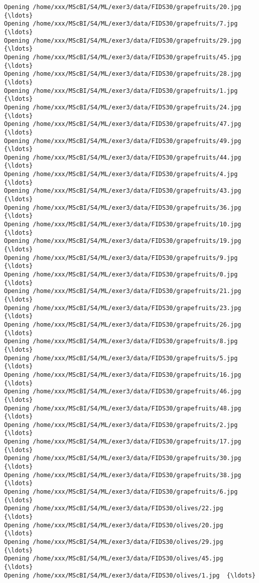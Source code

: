 \documentclass[11pt]{article}
\begin{document}
\begin{Verbatim}[commandchars=\\\{\}]
Opening /home/xxx/MScBI/S4/ML/exer3/data/FIDS30/grapefruits/20.jpg  {\ldots}
Opening /home/xxx/MScBI/S4/ML/exer3/data/FIDS30/grapefruits/7.jpg  {\ldots}
Opening /home/xxx/MScBI/S4/ML/exer3/data/FIDS30/grapefruits/29.jpg  {\ldots}
Opening /home/xxx/MScBI/S4/ML/exer3/data/FIDS30/grapefruits/45.jpg  {\ldots}
Opening /home/xxx/MScBI/S4/ML/exer3/data/FIDS30/grapefruits/28.jpg  {\ldots}
Opening /home/xxx/MScBI/S4/ML/exer3/data/FIDS30/grapefruits/1.jpg  {\ldots}
Opening /home/xxx/MScBI/S4/ML/exer3/data/FIDS30/grapefruits/24.jpg  {\ldots}
Opening /home/xxx/MScBI/S4/ML/exer3/data/FIDS30/grapefruits/47.jpg  {\ldots}
Opening /home/xxx/MScBI/S4/ML/exer3/data/FIDS30/grapefruits/49.jpg  {\ldots}
Opening /home/xxx/MScBI/S4/ML/exer3/data/FIDS30/grapefruits/44.jpg  {\ldots}
Opening /home/xxx/MScBI/S4/ML/exer3/data/FIDS30/grapefruits/4.jpg  {\ldots}
Opening /home/xxx/MScBI/S4/ML/exer3/data/FIDS30/grapefruits/43.jpg  {\ldots}
Opening /home/xxx/MScBI/S4/ML/exer3/data/FIDS30/grapefruits/36.jpg  {\ldots}
Opening /home/xxx/MScBI/S4/ML/exer3/data/FIDS30/grapefruits/10.jpg  {\ldots}
Opening /home/xxx/MScBI/S4/ML/exer3/data/FIDS30/grapefruits/19.jpg  {\ldots}
Opening /home/xxx/MScBI/S4/ML/exer3/data/FIDS30/grapefruits/9.jpg  {\ldots}
Opening /home/xxx/MScBI/S4/ML/exer3/data/FIDS30/grapefruits/0.jpg  {\ldots}
Opening /home/xxx/MScBI/S4/ML/exer3/data/FIDS30/grapefruits/21.jpg  {\ldots}
Opening /home/xxx/MScBI/S4/ML/exer3/data/FIDS30/grapefruits/23.jpg  {\ldots}
Opening /home/xxx/MScBI/S4/ML/exer3/data/FIDS30/grapefruits/26.jpg  {\ldots}
Opening /home/xxx/MScBI/S4/ML/exer3/data/FIDS30/grapefruits/8.jpg  {\ldots}
Opening /home/xxx/MScBI/S4/ML/exer3/data/FIDS30/grapefruits/5.jpg  {\ldots}
Opening /home/xxx/MScBI/S4/ML/exer3/data/FIDS30/grapefruits/16.jpg  {\ldots}
Opening /home/xxx/MScBI/S4/ML/exer3/data/FIDS30/grapefruits/46.jpg  {\ldots}
Opening /home/xxx/MScBI/S4/ML/exer3/data/FIDS30/grapefruits/48.jpg  {\ldots}
Opening /home/xxx/MScBI/S4/ML/exer3/data/FIDS30/grapefruits/2.jpg  {\ldots}
Opening /home/xxx/MScBI/S4/ML/exer3/data/FIDS30/grapefruits/17.jpg  {\ldots}
Opening /home/xxx/MScBI/S4/ML/exer3/data/FIDS30/grapefruits/30.jpg  {\ldots}
Opening /home/xxx/MScBI/S4/ML/exer3/data/FIDS30/grapefruits/38.jpg  {\ldots}
Opening /home/xxx/MScBI/S4/ML/exer3/data/FIDS30/grapefruits/6.jpg  {\ldots}
Opening /home/xxx/MScBI/S4/ML/exer3/data/FIDS30/olives/22.jpg  {\ldots}
Opening /home/xxx/MScBI/S4/ML/exer3/data/FIDS30/olives/20.jpg  {\ldots}
Opening /home/xxx/MScBI/S4/ML/exer3/data/FIDS30/olives/29.jpg  {\ldots}
Opening /home/xxx/MScBI/S4/ML/exer3/data/FIDS30/olives/45.jpg  {\ldots}
Opening /home/xxx/MScBI/S4/ML/exer3/data/FIDS30/olives/1.jpg  {\ldots}

\end{Verbatim}
\end{document}
